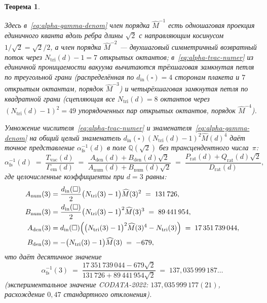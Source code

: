\documentclass[11pt,a4paper]{article}
\theoremstyle{plain}
\newtheorem{theorem}{Теорема}[section]
\theoremstyle{definition}
\begin{document}
\begin{theorem}
\begin{enumerate}[label=\textbf{(\arabic*)},leftmargin=*]
  Здесь в~\eqref{eq:alpha-gamma-denom} член порядка $\widehat{M}^{-1}$ есть одношаговая проекция единичного кванта вдоль ребра длины $\sqrt{2}$ с направляющим косинусом $1/\sqrt{2} = \sqrt{2}/2$, а член порядка $\widehat{M}^{-2}$ --- двухшаговый симметричный возвратный поток через $N_{\mathrm{tri}}(d) - 1 = 7$ открытых октантов; в~\eqref{eq:alpha-tvac-numer} из единичной проницаемости вакуума вычитаются трёхшаговая замкнутая петля по треугольной грани (распределённая по $d_{\mathrm{in}}(\square) = 4$ сторонам плакета и $7$ открытым октантам, порядок $\widehat{M}^{-3}$) и четырёхшаговая замкнутая петля по квадратной грани (сцепляющая все $N_{\mathrm{tri}}(d) = 8$ октантов через $(N_{\mathrm{tri}}(d) - 1)^2 = 49$ упорядоченных пар открытых октантов, порядок $\widehat{M}^{-4}$).

  Умножение числителя~\eqref{eq:alpha-tvac-numer} и знаменателя~\eqref{eq:alpha-gamma-denom} на общий целый знаменатель $d_{\mathrm{in}}(\square)(N_{\mathrm{tri}}(d) - 1)^2\widehat{M}(d)^4$ даёт точное представление $\alpha_{\mathrm{fs}}^{-1}(d)$ в поле $\mathbb{Q}(\sqrt{2})$ без трансцендентного числа~$\pi$:
  \begin{equation}
    \label{eq:alpha-fs-137}
    \alpha_{\mathrm{fs}}^{-1}(d) \;=\; \frac{T_{\mathrm{vac}}(d)}{\Gamma_{\mathrm{em}}(d)} \;=\; \frac{A_{\mathrm{den}}(d) + B_{\mathrm{den}}(d)\sqrt{2}}{A_{\mathrm{num}}(d) + B_{\mathrm{num}}(d)\sqrt{2}} \;=\; \frac{P_{\mathrm{rat}}(d) + Q_{\mathrm{rat}}(d)\sqrt{2}}{D_{\mathrm{rat}}(d)},
  \end{equation}
  где целочисленные коэффициенты при $d = 3$ равны:
  \begin{align}
    A_{\mathrm{num}}(3) &= \frac{d_{\mathrm{in}}(\square)}{2}\bigl(N_{\mathrm{tri}}(3) - 1\bigr)\widehat{M}(3)^2 \;=\; 131\,726, \label{eq:alpha-anum} \\
    B_{\mathrm{num}}(3) &= \frac{d_{\mathrm{in}}(\square)}{2}\bigl(N_{\mathrm{tri}}(3) - 1\bigr)^2\widehat{M}(3)^3 \;=\; 89\,441\,954, \label{eq:alpha-bnum} \\
    A_{\mathrm{den}}(3) &= d_{\mathrm{in}}(\square)\Bigl(\bigl(N_{\mathrm{tri}}(3) - 1\bigr)^2\widehat{M}(3)^4 - N_{\mathrm{tri}}(3)\Bigr) \;=\; 17\,351\,739\,044, \label{eq:alpha-aden} \\
    B_{\mathrm{den}}(3) &= -\bigl(N_{\mathrm{tri}}(3) - 1\bigr)\widehat{M}(3) \;=\; -679, \label{eq:alpha-bden}
  \end{align}
  что даёт десятичное значение
  \begin{equation}
    \label{eq:alpha-numeric-codata}
    \alpha_{\mathrm{fs}}^{-1}(3) \;=\; \frac{17\,351\,739\,044 - 679\sqrt{2}}{131\,726 + 89\,441\,954\sqrt{2}} \;=\; 137{,}035\,999\,187\dots
  \end{equation}
  (экспериментальное значение CODATA-2022: $137{,}035\,999\,177(21)$, расхождение $0{,}47$ стандартного отклонения).


\end{enumerate}
\end{theorem}
\end{document}
